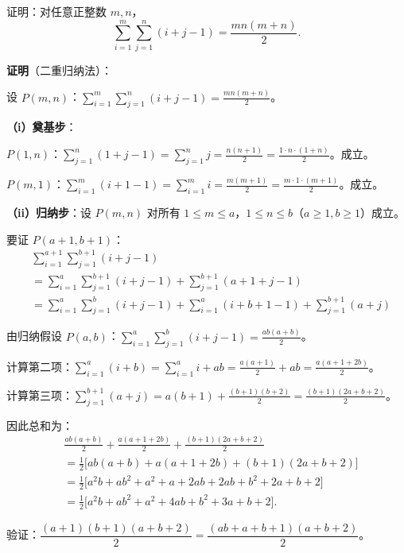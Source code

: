 \documentclass[12pt, a4paper]{ctexart}
\begin{document}
\begin{examplebox}[【例题9】用二重归纳法证明]
证明：对任意正整数 $m, n$，
\[ \sum_{i=1}^{m}\sum_{j=1}^{n}(i+j-1) = \frac{mn(m+n)}{2}. \]
\end{examplebox}

\textbf{证明}（二重归纳法）：

设 $P(m, n)$：$\displaystyle\sum_{i=1}^{m}\sum_{j=1}^{n}(i+j-1) = \frac{mn(m+n)}{2}$。

\textbf{（i）奠基步}：

$P(1, n)$：$\displaystyle\sum_{j=1}^{n}(1+j-1) = \sum_{j=1}^{n} j = \frac{n(n+1)}{2} = \frac{1 \cdot n \cdot (1+n)}{2}$。成立。

$P(m, 1)$：$\displaystyle\sum_{i=1}^{m}(i+1-1) = \sum_{i=1}^{m} i = \frac{m(m+1)}{2} = \frac{m \cdot 1 \cdot (m+1)}{2}$。成立。

\textbf{（ii）归纳步}：设 $P(m, n)$ 对所有 $1 \leq m \leq a$，$1 \leq n \leq b$（$a \geq 1, b \geq 1$）成立。

要证 $P(a+1, b+1)$：
\begin{align*}
&\sum_{i=1}^{a+1}\sum_{j=1}^{b+1}(i+j-1) \\
&= \sum_{i=1}^{a}\sum_{j=1}^{b+1}(i+j-1) + \sum_{j=1}^{b+1}(a+1+j-1) \\
&= \sum_{i=1}^{a}\sum_{j=1}^{b}(i+j-1) + \sum_{i=1}^{a}(i+b+1-1) + \sum_{j=1}^{b+1}(a+j)
\end{align*}

由归纳假设 $P(a, b)$：$\displaystyle\sum_{i=1}^{a}\sum_{j=1}^{b}(i+j-1) = \frac{ab(a+b)}{2}$。

计算第二项：$\displaystyle\sum_{i=1}^{a}(i+b) = \sum_{i=1}^{a} i + ab = \frac{a(a+1)}{2} + ab = \frac{a(a+1+2b)}{2}$。

计算第三项：$\displaystyle\sum_{j=1}^{b+1}(a+j) = a(b+1) + \frac{(b+1)(b+2)}{2} = \frac{(b+1)(2a+b+2)}{2}$。

因此总和为：
\begin{align*}
&\frac{ab(a+b)}{2} + \frac{a(a+1+2b)}{2} + \frac{(b+1)(2a+b+2)}{2} \\
&= \frac{1}{2}\Big[ab(a+b) + a(a+1+2b) + (b+1)(2a+b+2)\Big] \\
&= \frac{1}{2}\Big[a^2b + ab^2 + a^2 + a + 2ab + 2ab + b^2 + 2a + b + 2\Big] \\
&= \frac{1}{2}\Big[a^2b + ab^2 + a^2 + 4ab + b^2 + 3a + b + 2\Big].
\end{align*}

验证：$\dfrac{(a+1)(b+1)(a+b+2)}{2} = \dfrac{(ab+a+b+1)(a+b+2)}{2}$。
\end{document}
